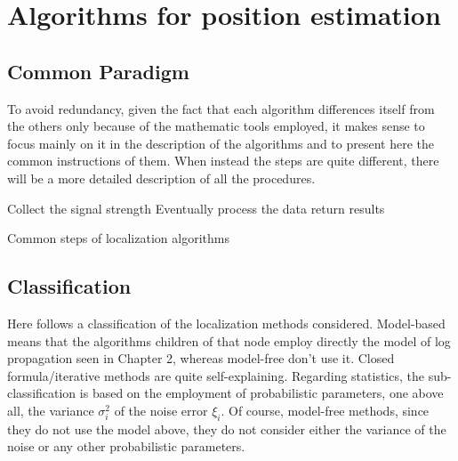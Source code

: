 \documentclass[12pt]{report}
\begin{document}
\clearpage

\chapter{Algorithms for position estimation}
\section{Common Paradigm}
To avoid redundancy, given the fact that each algorithm differences itself from the others only because of the mathematic tools employed, it makes sense to focus mainly on it in the description of the algorithms and to present here the common instructions of them.
When instead the steps are quite different, there will be a more detailed description of all the procedures.

\begin{algorithm}[H]
\SetAlgoLined
Collect the signal strength\;
Eventually process the data\;
return results\;
 \caption{Common steps of localization algorithms}
\end{algorithm}

\section{Classification}
Here follows a classification of the localization methods considered. Model-based means that the algorithms children of that node employ directly the model of log propagation seen in Chapter 2, whereas model-free don't use it. Closed formula/iterative methods are quite self-explaining. Regarding statistics, the sub-classification is based on the employment of probabilistic parameters, one above all, the variance $\sigma^2_i$ of the noise error $\xi_i$. Of course, model-free methods, since they do not use the model above, they do not consider either the variance of the noise or any other probabilistic parameters.

\begin{figure}
\end{figure}
\end{document}
